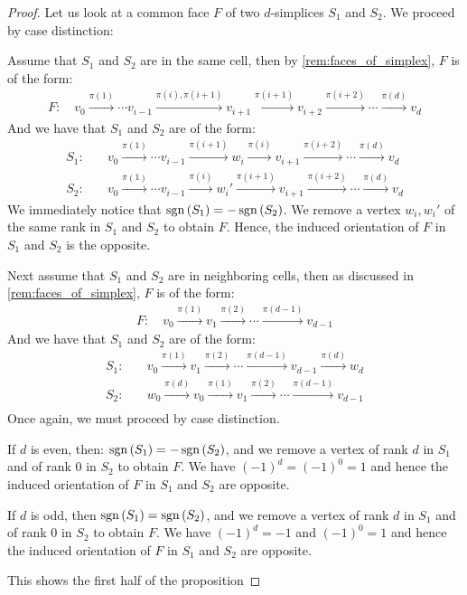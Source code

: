 \begin{proof}
	Let us look at a common face $F$ of two $d$-simplices $S_1$ and $S_2$. We proceed by case distinction:
	\begin{case}{1}
		Assume that $S_1$ and $S_2$ are in the same cell, then by \cref{rem:faces_of_simplex}, $F$ is of the form:
		\begin{align*}
			F: \quad v_0 \xrightarrow{\pi(1)}  \cdots v_{i-1} \xrightarrow{\pi(i), \pi(i+1)} v_{i+1} \xrightarrow{\pi(i+1)} v_{i+2} \xrightarrow{\pi(i+2)} \cdots \xrightarrow{\pi(d)} v_d
		\end{align*}
		And we have that $S_1$ and $S_2$ are of the form:
		\begin{align*}
			S_1: \quad & v_0 \xrightarrow{\pi(1)} \cdots v_{i-1} \xrightarrow{\pi(i+1)} w_i \xrightarrow{\pi(i)} v_{i+1} \xrightarrow{\pi(i+2)} \cdots \xrightarrow{\pi(d)} v_d  \\
			S_2: \quad & v_0 \xrightarrow{\pi(1)} \cdots v_{i-1} \xrightarrow{\pi(i)} w_i' \xrightarrow{\pi(i+1)} v_{i+1} \xrightarrow{\pi(i+2)} \cdots \xrightarrow{\pi(d)} v_d
		\end{align*}
		We immediately notice that $\operatorname{sgn}\left(S_1\right) = - \operatorname{sgn}\left(S_2\right)$. We remove a vertex $w_i, w_i'$ of the same rank in $S_1$ and $S_2$ to obtain $F$. Hence, the induced orientation of $F$ in $S_1$ and $S_2$ is the opposite.
	\end{case}
	\begin{case}{2}
		Next assume that $S_1$ and $S_2$ are in neighboring cells, then as discussed in \cref{rem:faces_of_simplex}, $F$ is of the form:
		\begin{align*}
			F: \quad v_0 \xrightarrow{\pi(1)} v_1 \xrightarrow{\pi(2)} \cdots \xrightarrow{\pi(d-1)} v_{d-1}
		\end{align*}
		And we have that $S_1$ and $S_2$ are of the form:
		\begin{align*}
			S_1: & \quad v_0 \xrightarrow{\pi(1)} v_1 \xrightarrow{\pi(2)} \cdots \xrightarrow{\pi(d-1)} v_{d-1} \xrightarrow{\pi(d)} w_d \\
			S_2: & \quad w_0 \xrightarrow{\pi(d)} v_0 \xrightarrow{\pi(1)} v_1 \xrightarrow{\pi(2)} \cdots \xrightarrow{\pi(d-1)} v_{d-1} \\
		\end{align*}
		Once again, we must proceed by case distinction.
		\begin{case}{2.1}
			If $d$ is even, then: $\operatorname{sgn}\left(S_1\right) = - \operatorname{sgn}\left(S_2\right)$, and we remove a vertex of rank $d$ in $S_1$ and of rank $0$ in $S_2$ to obtain $F$. We have ${(-1)}^d = {(-1)}^0 = 1$ and hence the induced orientation of $F$ in $S_1$ and $S_2$ are opposite.
		\end{case}
		\begin{case}{2.2}
			If $d$ is odd, then $\operatorname{sgn}\left(S_1\right) = \operatorname{sgn}\left(S_2\right)$, and we remove a vertex of rank $d$ in $S_1$ and of rank $0$ in $S_2$ to obtain $F$. We have ${(-1)}^d = -1$ and ${(-1)}^0 = 1$ and hence the induced orientation of $F$ in $S_1$ and $S_2$ are opposite.
		\end{case}
	\end{case}
	This shows the first half of the proposition
\end{proof}

